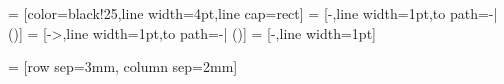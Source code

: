  = [color=black!25,line width=4pt,line cap=rect]
 = [-,line width=1pt,to path={-| (\tikztotarget)}]
 = [->,line width=1pt,to path={-| (\tikztotarget)}]
 = [-,line width=1pt]


 = [row sep=3mm, column sep=2mm]



\newcommand{\MultilineComponent}[2]
{
	\begin{minipage}{#1}
	\begin{center}
		#2
	\end{center}
	\end{minipage}
}

\newcommand{\TwolineComponent}[3]
{
	\begin{minipage}{#1}
	\begin{center}
		#2 \linebreak #3
	\end{center}
	\end{minipage}
}

\newcommand{\ThreelineComponent}[4]
{
	\begin{minipage}{#1}
	\begin{center}
		#2 \linebreak #3 \linebreak #4
	\end{center}
	\end{minipage}
}

\newcommand{\MultiColumnComponent}[5]
{
	\begin{minipage}{#1}
	\begin{center}
	#2 \linebreak #3
	\end{center}
	\begin{minipage}{0.49\textwidth}
	\begin{center}
	#4
	\end{center}
	\end{minipage}
	\begin{minipage}{0.49\textwidth}
	\begin{center}
	#5
	\end{center}
	\end{minipage}
	\end{minipage}
}

\def\arraystretch{1.3}
